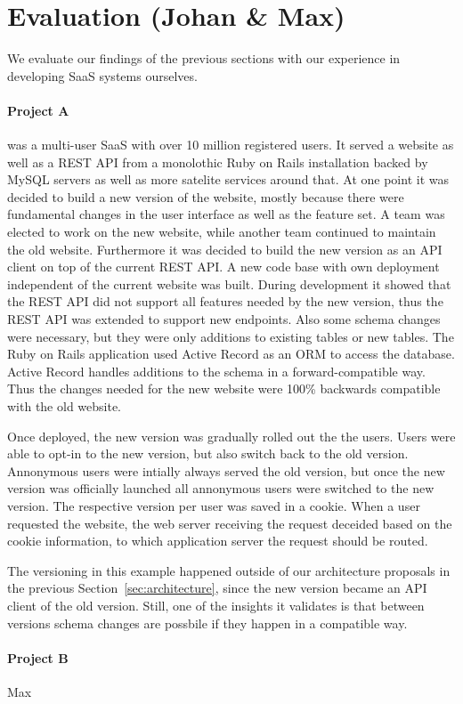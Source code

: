 \section{Evaluation (Johan \& Max)}
\label{sec:eval}

We evaluate our findings of the previous sections with our experience in developing SaaS systems ourselves.

\paragraph{Project A} was a multi-user SaaS with over 10 million registered users. It served a website as well as a REST API from a monolothic Ruby on Rails installation backed by MySQL servers as well as more satelite services around that. At one point it was decided to build a new version of the website, mostly because there were fundamental changes in the user interface as well as the feature set. A team was elected to work on the new website, while another team continued to maintain the old website. Furthermore it was decided to build the new version as an API client on top of the current REST API. A new code base with own deployment independent of the current website was built. During development it showed that the REST API did not support all features needed by the new version, thus the REST API was extended to support new endpoints. Also some schema changes were necessary, but they were only additions to existing tables or new tables. The Ruby on Rails application used Active Record as an ORM to access the database. Active Record handles additions to the schema in a forward-compatible way. Thus the changes needed for the new website were 100\% backwards compatible with the old website.

Once deployed, the new version was gradually rolled out the the users. Users were able to opt-in to the new version, but also switch back to the old version. Annonymous users were intially always served the old version, but once the new version was officially launched all annonymous users were switched to the new version. The respective version per user was saved in a cookie. When a user requested the website, the web server receiving the request deceided based on the cookie information, to which application server the request should be routed.

The versioning in this example happened outside of our architecture proposals in the previous Section~\ref{sec:architecture}, since the new version became an API client of the old version. Still, one of the insights it validates is that between versions schema changes are possbile if they happen in a compatible way.


\paragraph{Project B} Max

